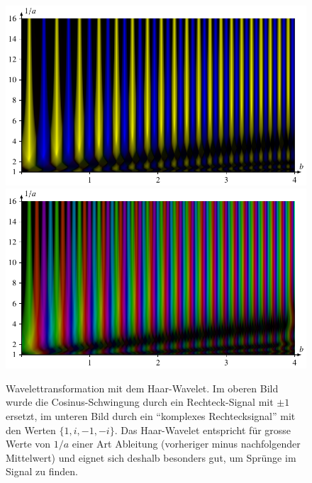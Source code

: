 \begin{figure}
	\centering
	\includegraphics[width=\linewidth, keepaspectratio]{papers/complex/images/add_rs_chirp_haar.pdf}
	\includegraphics[width=\linewidth, keepaspectratio]{papers/complex/images/add_cs_chirp_haar.pdf}
	\caption{Wavelettransformation mit dem Haar-Wavelet. 
		Im oberen Bild wurde die Cosinus-Schwingung durch ein Rechteck-Signal mit $\pm 1$ ersetzt, im unteren Bild durch ein ``komplexes Rechtecksignal'' mit den Werten $\lbrace1, i, -1, -i\rbrace$.
		Das Haar-Wavelet entspricht für grosse Werte von $1/a$ einer Art Ableitung (vorheriger minus nachfolgender Mittelwert) und eignet sich deshalb besonders gut, um Sprünge im Signal zu finden.}
\end{figure}


